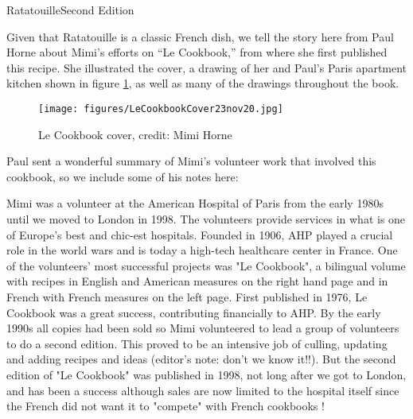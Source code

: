 \begin{entry}{Ratatouille}{Second Edition}
\label{sec:lecookbook}

\begin{open}
Given that Ratatouille is a classic French dish, we tell the story here from Paul Horne about Mimi's efforts on ``Le Cookbook,'' from where she first published this recipe. She illustrated the cover, a drawing of her and Paul's Paris apartment kitchen shown in figure \ref{fig:lecookbook}, as well as many of the drawings throughout the book.

\begin{figure}
  \centering
  \texttt{[image: figures/LeCookbookCover23nov20.jpg]}
  \caption{Le Cookbook cover, credit: Mimi Horne}
  \label{fig:lecookbook}
\end{figure}

Paul sent a wonderful summary of Mimi's volunteer work that involved this cookbook, so we include some of his notes here:

Mimi was a volunteer at the American Hospital of Paris from the early 1980s until we moved to London in 1998. The volunteers
provide services in what is one of Europe's best and chic-est hospitals. Founded in 1906, AHP played a crucial role in the world wars and is today a high-tech healthcare center in France. One of the volunteers' most successful projects was "Le Cookbook", a bilingual volume with recipes in English and American measures on the right hand page and in French with French measures on the left page. First published in 1976, Le Cookbook was a great success, contributing financially to AHP. By the early 1990s all copies had been sold so Mimi volunteered to lead a group of volunteers to do a second edition. This proved to be an intensive job of culling, updating and adding recipes and ideas (editor's note: don't we know it!!). But the second edition of "Le Cookbook" was published in 1998, not long after we got to London, and has been a success although sales are now limited to the hospital itself since the French did not want it to "compete" with French cookbooks !


\end{open}
\end{entry}

